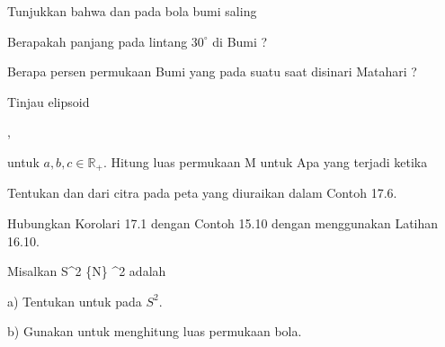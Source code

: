{}
{

Tunjukkan bahwa
dan
pada bola bumi saling

}
{} {}

{}
{

Berapakah panjang
 pada lintang $30^\circ$ di Bumi
 {} {?}

}
{} {}

{}
{

Berapa persen permukaan Bumi yang pada suatu saat disinari Matahari
 {} {?}

}
{} {}

{}
{

Tinjau elipsoid

 { , }

untuk $a,b,c\in\mathbb{R}_{+}$. Hitung luas permukaan M untuk
 Apa yang terjadi ketika

}
{} {}

{}
{

Tentukan
dan
dari
citra
pada peta yang diuraikan dalam
Contoh 17.6.

}
{} {}

{}
{

Hubungkan
Korolari 17.1
dengan
Contoh 15.10
dengan menggunakan
Latihan 16.10.

}
{} {}

{}
{

Misalkan
\maabbdisp {\alpha} {S^2 \setminus \{N\}} { \R^2
} {}
adalah

a) Tentukan
\mathl{\alpha_* \omega}{} untuk
pada $S^2$.

b) Gunakan
\mathl{\alpha_* \omega}{} untuk menghitung luas permukaan bola.

}
{} {}


